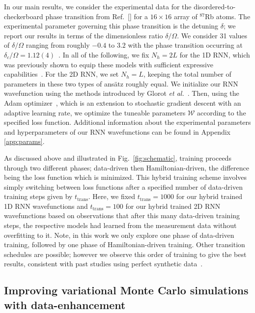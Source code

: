 \documentclass[twocolumn,
                showpacs,
                nofootinbib,
                nobibnotes,
                aps,
                superscriptaddress,
                amssymb,
                amsmath,
                floatfix,
                reprint,
                prx, 
                notitlepage,
                showkeys,
                10pt,
		]{revtex4-2}
\begin{document}
In our main results, we consider the experimental data for the disordered-to-checkerboard phase transition from Ref.~[] for a $16 \times 16$ array of $^{87}$Rb atoms. 
The experimental parameter governing this phase transition is the detuning $\delta$; we report our results in terms of the dimensionless ratio $\delta/\Omega$. 
We consider 31 values of $\delta/\Omega$ ranging from roughly $-0.4$ to $3.2$ with the phase transition occurring at $\delta_c/\Omega = 1.12(4)$~\cite{ebadi2021quantum}.
In all of the following, we fix $N_h = 2L$ for the 1D RNN, which was previously shown to equip these models with sufficient expressive capabilities~\cite{czischek2022data}. For the 2D RNN, we set $N_h = L$, keeping the total number of parameters in these two types of ans\"atz roughly equal. 
We initialize our RNN wavefunction using the methods introduced by Glorot \emph{et al.}~\cite{pmlr-v9-glorot10a}. Then, using the Adam optimizer~\cite{kingma2014adam}, which is an extension to stochastic gradient descent with an adaptive learning rate, we optimize the tuneable parameters $\mathcal{W}$ according to the specified loss function.
Additional information about the experimental parameters and hyperparameters of our RNN wavefunctions can be found in Appendix \ref{app:params}.

As discussed above and illustrated in Fig.~\ref{fig:schematic}, training proceeds through two different phases; data-driven then Hamiltonian-driven,
the difference being the loss function which is minimized. This hybrid training scheme involves simply switching between loss functions after a specified number of data-driven training steps given by $t_{\text{trans}}$.
Here, we fixed $t_{\text{trans}} = 1000$ for our hybrid trained 1D RNN wavefunctions and $t_{\text{trans}}=100$ for our hybrid trained 2D RNN wavefunctions based on observations that after this many data-driven training steps, the respective models had learned from the measurement data without overfitting to it. 
Note, in this work we only explore one phase of data-driven training, followed by one phase of Hamiltonian-driven training.  Other transition schedules are possible; however we observe this order of training to give the best results, consistent with past studies using perfect synthetic data~\cite{czischek2022data}.


\subsection{Improving variational Monte Carlo simulations with data-enhancement} 
\end{document}
